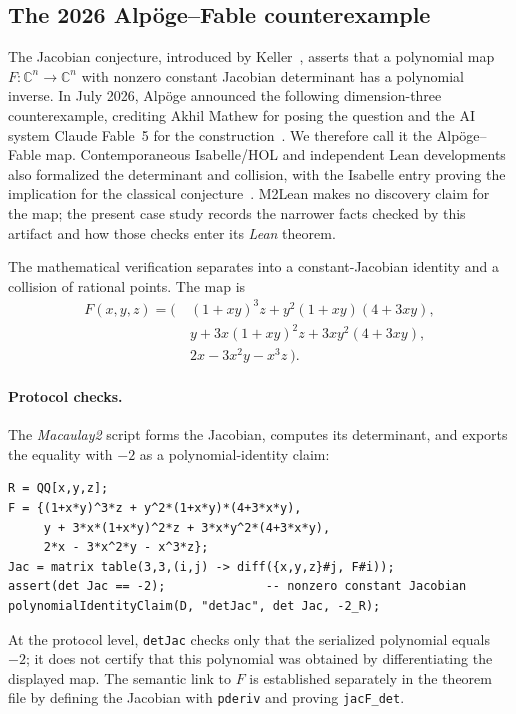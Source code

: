 \documentclass[11pt]{article}
\newcommand{\M}{\textit{Macaulay2}}
\newcommand{\lean}{\textit{Lean}}
\newcommand{\CC}{\mathbb{C}}
\newcommand{\code}[1]{\texttt{#1}}
\begin{document}
\subsection{The 2026 Alp\"oge--Fable counterexample}\label{sec:jacobian}

The Jacobian conjecture, introduced by Keller~\cite{keller1939},
asserts that a polynomial map $F:\CC^n\to\CC^n$ with nonzero constant
Jacobian determinant has a polynomial inverse.  In July 2026,
Alp\"oge announced the following dimension-three counterexample,
crediting Akhil Mathew for posing the question and the AI system Claude
Fable~5 for the construction~\cite{alpoge-jacobian}.  We therefore call
it the Alp\"oge--Fable map.  Contemporaneous Isabelle/HOL and independent
Lean developments also formalized the determinant and collision, with
the Isabelle entry proving the implication for the classical
conjecture~\cite{jacobian-afp,jacobian-lean-independent}.  M2Lean makes no
discovery claim for the map; the present case study records the narrower
facts checked by this artifact and how those checks enter its \lean{}
theorem.

The mathematical verification separates into a constant-Jacobian
identity and a collision of rational points.  The map is
\begin{align*}
F(x,y,z)=\bigl(~\!& (1+xy)^3 z + y^2 (1+xy)(4+3xy),\\
                 & y + 3x(1+xy)^2 z + 3x y^2 (4+3xy),\\
                 & 2x - 3x^2 y - x^3 z ~\!\bigr).
\end{align*}

\paragraph{Protocol checks.}
The \M{} script forms the Jacobian, computes its determinant, and
exports the equality with $-2$ as a polynomial-identity claim:
\begin{lstlisting}[style=m2style]
R = QQ[x,y,z];
F = {(1+x*y)^3*z + y^2*(1+x*y)*(4+3*x*y),
     y + 3*x*(1+x*y)^2*z + 3*x*y^2*(4+3*x*y),
     2*x - 3*x^2*y - x^3*z};
Jac = matrix table(3,3,(i,j) -> diff({x,y,z}#j, F#i));
assert(det Jac == -2);              -- nonzero constant Jacobian
polynomialIdentityClaim(D, "detJac", det Jac, -2_R);
\end{lstlisting}

At the protocol level, \code{detJac} checks only that the serialized
polynomial equals $-2$; it does not certify that this polynomial was
obtained by differentiating the displayed map.  The semantic link to
$F$ is established separately in the theorem file by defining the
Jacobian with \code{pderiv} and proving \code{jacF\_det}.
\end{document}
